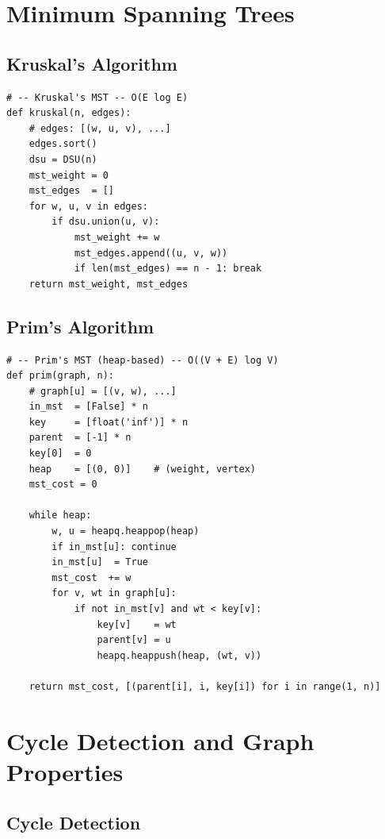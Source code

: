 \documentclass[11pt,a4paper]{report}
\begin{document}
\chapter{Minimum Spanning Trees}

\section{Kruskal's Algorithm}

\begin{lstlisting}
# -- Kruskal's MST -- O(E log E)
def kruskal(n, edges):
    # edges: [(w, u, v), ...]
    edges.sort()
    dsu = DSU(n)
    mst_weight = 0
    mst_edges  = []
    for w, u, v in edges:
        if dsu.union(u, v):
            mst_weight += w
            mst_edges.append((u, v, w))
            if len(mst_edges) == n - 1: break
    return mst_weight, mst_edges
\end{lstlisting}

\section{Prim's Algorithm}

\begin{lstlisting}
# -- Prim's MST (heap-based) -- O((V + E) log V)
def prim(graph, n):
    # graph[u] = [(v, w), ...]
    in_mst  = [False] * n
    key     = [float('inf')] * n
    parent  = [-1] * n
    key[0]  = 0
    heap    = [(0, 0)]    # (weight, vertex)
    mst_cost = 0

    while heap:
        w, u = heapq.heappop(heap)
        if in_mst[u]: continue
        in_mst[u]  = True
        mst_cost  += w
        for v, wt in graph[u]:
            if not in_mst[v] and wt < key[v]:
                key[v]    = wt
                parent[v] = u
                heapq.heappush(heap, (wt, v))

    return mst_cost, [(parent[i], i, key[i]) for i in range(1, n)]
\end{lstlisting}

\chapter{Cycle Detection and Graph Properties}

\section{Cycle Detection}
\end{document}
